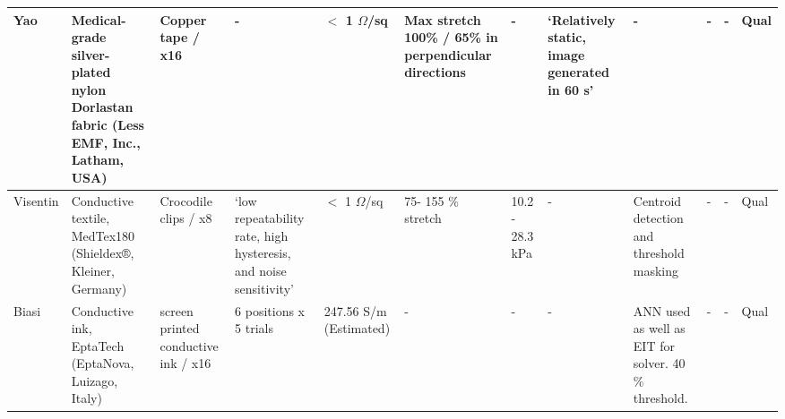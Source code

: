 \begin{landscape}
\begin{table}[H]
\begin{tabular}{|L{1.9cm}|L{2.8cm}|L{2.0cm}|L{2.4cm}|L{2.2cm}|L{2.0cm}|L{1.7cm}|L{1.7cm}|L{2.5cm}|L{2.2cm}|L{1.6cm}|L{1.6cm}|}
				Yao \citep{Yao2012}& Medical-grade silver-plated nylon Dorlastan  fabric  (Less EMF, Inc., Latham, USA) & Copper tape / x16 & - & $<$ 1 $\Omega$/sq & Max stretch 100\% / 65\% in perpendicular directions & - & `Relatively static, image generated in 60 s' & - & - & - & Qual \\ \hline
				
				Visentin \citep{Visentin2016} & Conductive textile, MedTex180 (Shieldex®, Kleiner, Germany) & Crocodile clips / x8 & `low repeatability rate, high hysteresis, and noise sensitivity' & $<$ 1 $\Omega$/sq & 75- 155 \% stretch & 10.2 - 28.3 kPa & - & Centroid detection and threshold masking & - & - & Qual \\ \hline
				
				Biasi \citep{Biasi2022} & Conductive ink, EptaTech (EptaNova, Luizago, Italy) & screen printed conductive ink / x16 & 6 positions x 5 trials & 247.56 S/m (Estimated) & - & - & - & ANN used as well as EIT for solver. 40 \% threshold. & - & - & Qual \\ \hline
				
				
			\end{tabular}
		\end{table}
\end{landscape}
